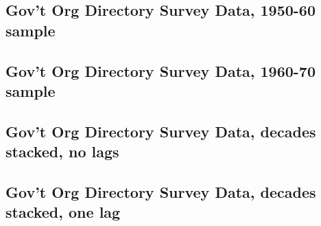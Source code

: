 \documentclass{article}
\begin{document}
{{{			\subsection{Gov't Org Directory Survey Data, 1950-60 sample}
			
			
			
			
			\clearpage
			
			\subsection{Gov't Org Directory Survey Data, 1960-70 sample}
			
			
			
			
			\clearpage
			
			\subsection{Gov't Org Directory Survey Data, decades stacked, no lags}
			
			
			
			
			\clearpage
			
			\subsection{Gov't Org Directory Survey Data, decades stacked, one lag}
			
			
			
			
			\clearpage
			
			
			
		}
	}
}
\end{document}
